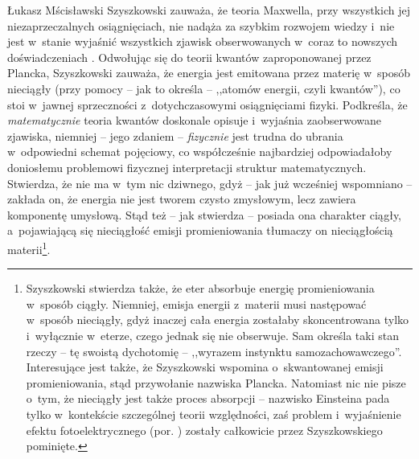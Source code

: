 \begin{artplenv}{Łukasz Mścisławski}
Szyszkowski zauważa, że teoria Maxwella, przy wszystkich jej niezaprzeczalnych osiągnięciach, nie nadąża za szybkim rozwojem wiedzy i~nie jest w~stanie wyjaśnić wszystkich zjawisk obserwowanych w~coraz to nowszych doświadczeniach
\parencite[por.][s.~53]{szyszkowski_o_1916}. %
 Odwołując się do teorii kwantów zaproponowanej przez Plancka, Szyszkowski zauważa, że energia jest emitowana przez materię w~sposób nieciągły (przy pomocy -- jak to określa -- ,,atomów energii, czyli kwantów''), co stoi w~jawnej sprzeczności z~dotychczasowymi osiągnięciami fizyki. Podkreśla, że \textit{matematycznie} teoria kwantów doskonale opisuje i~wyjaśnia zaobserwowane zjawiska, niemniej -- jego zdaniem -- \textit{fizycznie} jest trudna do ubrania w~odpowiedni schemat pojęciowy, co współcześnie najbardziej odpowiadałoby doniosłemu problemowi fizycznej interpretacji struktur matematycznych. Stwierdza, że nie ma w~tym nic dziwnego, gdyż -- jak już wcześniej wspomniano -- zakłada on, że energia nie jest tworem czysto zmysłowym, lecz zawiera komponentę umysłową. Stąd też -- jak stwierdza -- posiada ona charakter ciągły, a~pojawiającą się nieciągłość emisji promieniowania tłumaczy on nieciągłością materii\footnote{Szyszkowski stwierdza także, że eter absorbuje energię promieniowania w~sposób ciągły. Niemniej, emisja energii z~materii musi następować w~sposób nieciągły, gdyż inaczej cała energia zostałaby skoncentrowana tylko i~wyłącznie w~eterze, czego jednak się nie obserwuje. Sam określa taki stan rzeczy -- tę swoistą dychotomię -- ,,wyrazem instynktu samozachowawczego''. Interesujące jest także, że Szyszkowski wspomina o~skwantowanej emisji promieniowania, stąd przywołanie nazwiska Plancka. Natomiast nic nie pisze o~tym, że nieciągły jest także proces absorpcji -- nazwisko Einsteina pada tylko w~kontekście szczególnej teorii względności, zaś problem i~wyjaśnienie efektu fotoelektrycznego (por. 
\parencite[][]{einstein_uber_1905}%
) zostały całkowicie przez Szyszkowskiego pominięte.}.


\end{artplenv}
